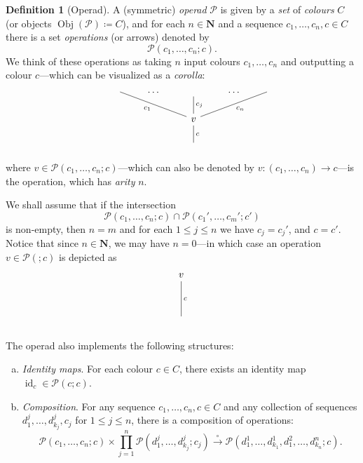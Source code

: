 \documentclass[11pt, reqno]{amsart}
\theoremstyle{definition}
\newtheorem{definition}[theorem]{Definition}
\renewcommand{\leq}{\leqslant}
\newcommand{\N}{\mathbf{N}}
\DeclareMathOperator{\Obj}{Obj}   %
\DeclareMathOperator{\Id}{id}     %
\newcommand{\operad}{\mathcal}
\begin{document}
\begin{definition}[Operad]
\label{def:operad}
A (symmetric) \emph{operad} \(\operad P\) is given by a \emph{set} of
\emph{colours} \(C\) (or objects \(\Obj(\operad P) \coloneq C\)), and for each
\(n \in \N\) and a sequence \(c_1, \dots, c_n, c \in C\) there is a set
\emph{operations} (or arrows) denoted by
\[
\operad P(c_1, \ldots, c_n; c).
\]
We think of these operations as taking \(n\) input colours \(c_1, \dots, c_n\)
and outputting a colour \(c\)---which can be visualized as a \emph{corolla}:
\begin{equation}\label{eq:operad-arrow-as-tree}
    \begin{tikzcd}
        &\ar[drr, no head, "c_1"'] 
        &\dots 
        &\ar[d, no head, "c_j"] 
        &\dots 
        &\ar[dll, no head, "c_n"]
        \\
        & & &v \ar[d, no head, "c"] & &
        \\
        & & &\phantom{v} & &
    \end{tikzcd}
\end{equation}
where \(v \in \operad P(c_1, \ldots, c_n; c)\)---which can also be denoted by
\(v: (c_1, \ldots, c_n) \to c\)---is the operation, which has \emph{arity}
\(n\).

We shall assume that if the intersection 
\[
    \operad P(c_1, \dots, c_n; c) \cap \operad P(c_1', \dots, c_m'; c')
\]
is non-empty, then \(n = m\) and for each \(1 \leq j \leq n\) we have \(c_j =
c_j'\), and \(c = c'\). Notice that since \(n \in \N\), we may have \(n = 0\)---in which case an operation \(v \in \operad P(; c)\) is depicted as
\[
    \begin{tikzcd}
        v \ar[dd, "c", no head] \\ \\
        \phantom{v}
    \end{tikzcd}
\]

The operad also implements the following structures:
\begin{enumerate}[(a)]\setlength\itemsep{0em}
    \item \emph{Identity maps}. For each colour \(c \in C\), there exists an
    identity map \(\Id_c \in \operad P(c; c)\).

    \item \emph{Composition}. For any sequence \(c_1, \dots, c_n, c \in C\) and
    any collection of sequences \(d_1^j, \dots, d_{k_j}^j, c_j\) for \(1
    \leq j \leq n\), there is a composition of operations:
    \[
    \operad P(c_1, \dots, c_n; c)
    \times \prod_{j=1}^n \operad P(d_1^j, \dots, d_{k_j}^j; c_j)
    \overset{\circ}\longrightarrow
    \operad P(d_1^1, \dots, d_{k_1}^1, d_1^2, \dots, d_{k_n}^n; c).
    \]


\end{enumerate}
\end{definition}
\end{document}
